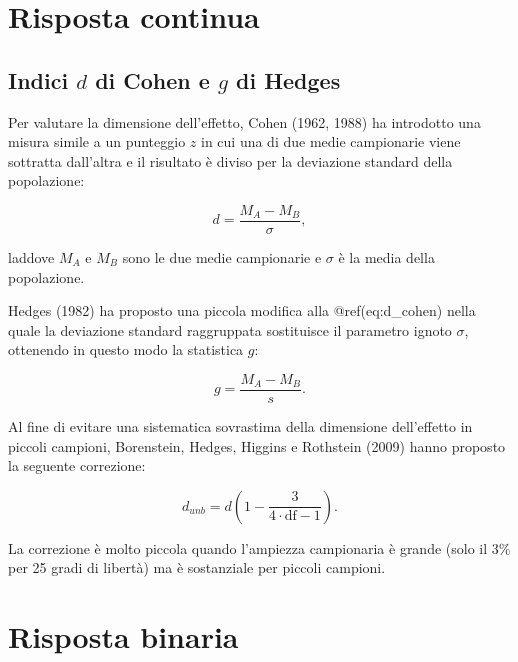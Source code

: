 \documentclass[
  11pt,
]{krantz}
\theoremstyle{definition}
\theoremstyle{definition}
\theoremstyle{definition}
\theoremstyle{definition}
\theoremstyle{remark}
\begin{document}
\hypertarget{sec:cont_reponse_eff_size}{%
\section{Risposta continua}\label{sec:cont_reponse_eff_size}}

\hypertarget{indici-d-di-cohen-e-g-di-hedges}{%
\subsection{\texorpdfstring{Indici \(d\) di Cohen e \(g\) di Hedges}{Indici d di Cohen e g di Hedges}}\label{indici-d-di-cohen-e-g-di-hedges}}

Per valutare la dimensione dell'effetto, Cohen (1962, 1988) ha introdotto una misura simile a un punteggio \(z\) in cui una di due medie campionarie viene sottratta dall'altra e il risultato è diviso per la deviazione standard della popolazione:

\begin{equation}
d = \frac{M_A - M_B}{\sigma},
\label{eq:d-cohen}
\end{equation}

laddove \(M_A\) e \(M_B\) sono le due medie campionarie e \(\sigma\) è la media della popolazione.

Hedges (1982) ha proposto una piccola modifica alla @ref(eq:d\_cohen) nella quale la deviazione standard raggruppata sostituisce il parametro ignoto \(\sigma\), ottenendo in questo modo la statistica \(g\):

\begin{equation}
g = \frac{M_A - M_B}{s}.
\label{eq:g-eff-size}
\end{equation}

Al fine di evitare una sistematica sovrastima della dimensione dell'effetto in piccoli campioni, Borenstein, Hedges, Higgins e Rothstein (2009) hanno proposto la seguente correzione:

\begin{equation}
d_{unb} = d \left(1 - \frac{3}{4 \cdot \text{df} - 1} \right).
\label{eq:d-unbiased}
\end{equation}

La correzione è molto piccola quando l'ampiezza campionaria è grande (solo il 3\% per 25 gradi di libertà) ma è sostanziale per piccoli campioni.

\hypertarget{sec:binary_reponse_eff_size}{%
\section{Risposta binaria}\label{sec:binary_reponse_eff_size}}
\end{document}
